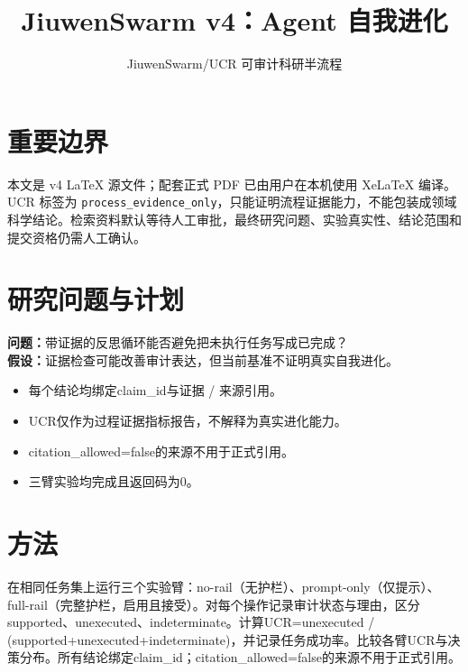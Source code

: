 \documentclass[UTF8]{ctexart}
\title{JiuwenSwarm v4：Agent 自我进化}
\author{JiuwenSwarm/UCR 可审计科研半流程}
\date{}
\begin{document}
\maketitle
\section{重要边界}
本文是 v4 LaTeX 源文件；配套正式 PDF 已由用户在本机使用 XeLaTeX 编译。UCR 标签为 \texttt{process\_evidence\_only}，只能证明流程证据能力，不能包装成领域科学结论。检索资料默认等待人工审批，最终研究问题、实验真实性、结论范围和提交资格仍需人工确认。
\section{研究问题与计划}
\textbf{问题：}带证据的反思循环能否避免把未执行任务写成已完成？\\
\textbf{假设：}证据检查可能改善审计表达，但当前基准不证明真实自我进化。
\begin{itemize}
\item 每个结论均绑定claim\_\allowbreak{}id与证据 / 来源引用。
\item UCR仅作为过程证据指标报告，不解释为真实进化能力。
\item citation\_\allowbreak{}allowed=false的来源不用于正式引用。
\item 三臂实验均完成且返回码为0。
\end{itemize}
\section{方法}
在相同任务集上运行三个实验臂：no-\allowbreak{}rail（无护栏）、prompt-\allowbreak{}only（仅提示）、full-\allowbreak{}rail（完整护栏，启用且接受）。对每个操作记录审计状态与理由，区分supported、unexecuted、indeterminate。计算UCR=unexecuted / (supported+unexecuted+indeterminate)，并记录任务成功率。比较各臂UCR与决策分布。所有结论绑定claim\_\allowbreak{}id；citation\_\allowbreak{}allowed=false的来源不用于正式引用。
\end{document}
